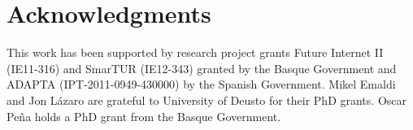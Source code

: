 \section{Acknowledgments}

This work has been supported by research project grants Future Internet II (IE11-316) and SmarTUR (IE12-343) granted by the Basque Government and ADAPTA (IPT-2011-0949-430000) by the Spanish Government. Mikel Emaldi and Jon Lázaro are grateful to University of Deusto for their PhD grants. Oscar Peña holds a PhD grant from the Basque Government.  
